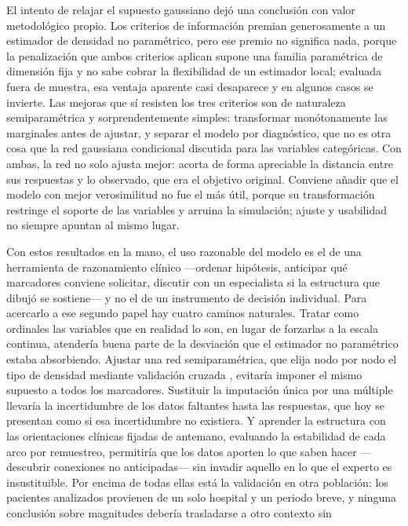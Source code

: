 \documentclass[11pt, a4paper]{article}
\begin{document}
El intento de relajar el supuesto gaussiano dejó una conclusión con valor metodológico propio. Los
criterios de información premian generosamente a un estimador de densidad no paramétrico, pero ese
premio no significa nada, porque la penalización que ambos criterios aplican supone una familia
paramétrica de dimensión fija y no sabe cobrar la flexibilidad de un estimador local; evaluada
fuera de muestra, esa ventaja aparente casi desaparece y en algunos casos se invierte. Las mejoras
que sí resisten los tres criterios son de naturaleza semiparamétrica y sorprendentemente simples:
transformar monótonamente las marginales antes de ajustar, y separar el modelo por diagnóstico, que
no es otra cosa que la red gaussiana condicional discutida para las variables categóricas. Con
ambas, la red no solo ajusta mejor: acorta de forma apreciable la distancia entre sus respuestas y
lo observado, que era el objetivo original. Conviene añadir que el modelo con mejor verosimilitud
no fue el más útil, porque su transformación restringe el soporte de las variables y arruina la
simulación; ajuste y usabilidad no siempre apuntan al mismo lugar.

Con estos resultados en la mano, el uso razonable del modelo es el de una herramienta de
razonamiento clínico —ordenar hipótesis, anticipar qué marcadores conviene solicitar, discutir con
un especialista si la estructura que dibujó se sostiene— y no el de un instrumento de decisión
individual. Para acercarlo a ese segundo papel hay cuatro caminos naturales. Tratar como ordinales
las variables que en realidad lo son, en lugar de forzarlas a la escala continua, atendería buena
parte de la desviación que el estimador no paramétrico estaba absorbiendo. Ajustar una red
semiparamétrica, que elija nodo por nodo el tipo de densidad mediante validación cruzada
\cite{atienza2022}, evitaría imponer el mismo supuesto a todos los marcadores. Sustituir la
imputación única por una múltiple llevaría la incertidumbre de los datos faltantes hasta las
respuestas, que hoy se presentan como si esa incertidumbre no existiera. Y aprender la estructura
con las orientaciones clínicas fijadas de antemano, evaluando la estabilidad de cada arco por
remuestreo, permitiría que los datos aporten lo que saben hacer —descubrir conexiones no
anticipadas— sin invadir aquello en lo que el experto es insustituible. Por encima de todas ellas
está la validación en otra población: los pacientes analizados provienen de un solo hospital y un
periodo breve, y ninguna conclusión sobre magnitudes debería trasladarse a otro contexto sin
\end{document}
